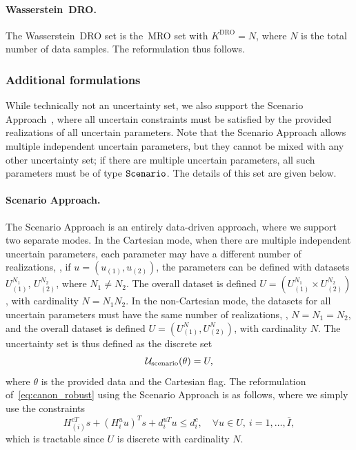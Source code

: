 \paragraph{Wasserstein~\gls{DRO}.}
The Wasserstein~\gls{DRO} set is the~\gls{MRO} set with $K^{\text{DRO}} = N$, where $N$ is the total number of data samples. The reformulation thus follows. 

\subsubsection{Additional formulations}
While technically not an uncertainty set, we also support the Scenario Approach~\cite{scenario}, where all uncertain constraints must be satisfied by the provided realizations of all uncertain parameters. Note that the Scenario Approach allows multiple independent uncertain parameters, but they cannot be mixed with any other uncertainty set; if there are multiple uncertain parameters, all such parameters must be of type $\tt{Scenario}$. The details of this set are given below.

\paragraph{Scenario Approach.}
The Scenario Approach is an entirely data-driven approach, where we support two separate modes. In the Cartesian mode, when there are multiple independent uncertain parameters, each parameter may have a different number of realizations, \ie, if $u = (u_{(1)},u_{(2)})$, the parameters can be defined with datasets $U^{N_1}_{(1)}$, $U^{N_2}_{(2)}$, where $N_1 \neq N_2$. The overall dataset is defined $U = (U^{N_1}_{(1)}\times U^{N_2}_{(2)})$, with cardinality $N = N_1 N_2$.
In the non-Cartesian mode, the datasets for all uncertain parameters must have the same number of realizations, \ie, $N = N_1=N_2$, and the overall dataset is defined $U = (U^{N}_{(1)}, U^{N}_{(2)})$, with cardinality $N$.
The uncertainty set is thus defined as the discrete set
$$ {\mathcal{U}}_{\text{scenario}}(\theta) = U,$$
where $\theta$ is the provided data and the Cartesian flag. 
The reformulation of~\eqref{eq:canon_robust} using the Scenario Approach is as follows, where we simply use the constraints
\begin{equation}
\label{eq:simpleaffine_scenario}
H^{cT}_{(i)}s + (H_i^uu)^Ts + d_i^{uT}u \le d_i^c, \quad \forall u \in U,~i = 1,\dots,\bar{I},
\end{equation}
which is tractable since $U$ is discrete with cardinality $N$.




